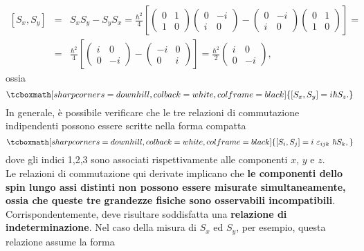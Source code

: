 	\begin{eqnarray}
		\left[ S_x , S_y \right] & = & S_x S_y-S_y S_x= 
		\frac{\hbar ^2}{4} \left[\begin{pmatrix}
		0 & 1\\
		1 & 0
		\end{pmatrix} \begin{pmatrix}
		0 & -i\\
		i & 0
		\end{pmatrix}- \begin{pmatrix}
		0 & -i\\
		i & 0
		\end{pmatrix}\begin{pmatrix}
		0 & 1\\
		1 & 0
		\end{pmatrix}
		\right] = \nonumber \\
		& = &\frac{\hbar ^2}{4} \left[\begin{pmatrix}
		i & 0\\
		0 & -i
		\end{pmatrix} - \begin{pmatrix}
		-i & 0\\
		0 & i
		\end{pmatrix}\right] = 	
		\frac{\hbar ^2}{2}\begin{pmatrix}
		i & 0\\
		0 & -i
		\end{pmatrix},
	\end{eqnarray}
ossia
	\begin{equation}
		\tcboxmath[sharp corners=downhill, colback=white, colframe=black]{
			\left[ S_x, S_y \right] = i \hbar S_z.
			}
	\end{equation}
In generale, è possibile verificare che le tre relazioni di commutazione indipendenti possono essere scritte nella forma compatta
	\begin{equation}
		\tcboxmath[sharp corners=downhill, colback=white, colframe=black]{
			\left[ S_i , S_j\right] = i\ \varepsilon_{ijk}\ \hbar S_k,
			}
	\end{equation}
dove gli indici 1,2,3 sono associati rispettivamente alle componenti $x$, $y$ e $z$.\\
Le relazioni di commutazione qui derivate implicano che \textbf{le componenti dello spin lungo assi distinti non possono essere misurate simultaneamente, ossia che queste tre grandezze fisiche sono osservabili incompatibili}. Corrispondentemente, deve risultare soddisfatta una \textbf{relazione di indeterminazione}. Nel caso della misura di $S_x$ ed $S_y$, per esempio, questa relazione assume la forma
